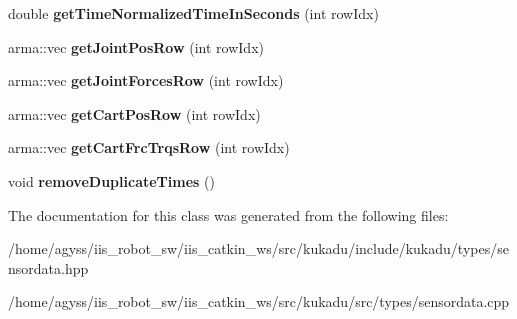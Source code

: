 \begin{DoxyCompactItemize}
\item 
double {\bfseries get\+Time\+Normalized\+Time\+In\+Seconds} (int row\+Idx)\hypertarget{classkukadu_1_1SensorData_a36d4fc794ba12e8730ea67db8fd89754}{}\label{classkukadu_1_1SensorData_a36d4fc794ba12e8730ea67db8fd89754}

\item 
arma\+::vec {\bfseries get\+Joint\+Pos\+Row} (int row\+Idx)\hypertarget{classkukadu_1_1SensorData_a64834aa2eff88e5af2264f610acaa838}{}\label{classkukadu_1_1SensorData_a64834aa2eff88e5af2264f610acaa838}

\item 
arma\+::vec {\bfseries get\+Joint\+Forces\+Row} (int row\+Idx)\hypertarget{classkukadu_1_1SensorData_a4635d5f1dd53cc3eced94b7e0ff5a8b7}{}\label{classkukadu_1_1SensorData_a4635d5f1dd53cc3eced94b7e0ff5a8b7}

\item 
arma\+::vec {\bfseries get\+Cart\+Pos\+Row} (int row\+Idx)\hypertarget{classkukadu_1_1SensorData_abd2fbd3a0e16a9537a07c532cd0b125e}{}\label{classkukadu_1_1SensorData_abd2fbd3a0e16a9537a07c532cd0b125e}

\item 
arma\+::vec {\bfseries get\+Cart\+Frc\+Trqs\+Row} (int row\+Idx)\hypertarget{classkukadu_1_1SensorData_af0d6d78e9d54ebcbc635e09e0ba9a707}{}\label{classkukadu_1_1SensorData_af0d6d78e9d54ebcbc635e09e0ba9a707}

\item 
void {\bfseries remove\+Duplicate\+Times} ()\hypertarget{classkukadu_1_1SensorData_a0efd2b1e84f5fccd65f105625803f75b}{}\label{classkukadu_1_1SensorData_a0efd2b1e84f5fccd65f105625803f75b}

\end{DoxyCompactItemize}


The documentation for this class was generated from the following files\+:\begin{DoxyCompactItemize}
\item 
/home/agyss/iis\+\_\+robot\+\_\+sw/iis\+\_\+catkin\+\_\+ws/src/kukadu/include/kukadu/types/sensordata.\+hpp\item 
/home/agyss/iis\+\_\+robot\+\_\+sw/iis\+\_\+catkin\+\_\+ws/src/kukadu/src/types/sensordata.\+cpp\end{DoxyCompactItemize}

